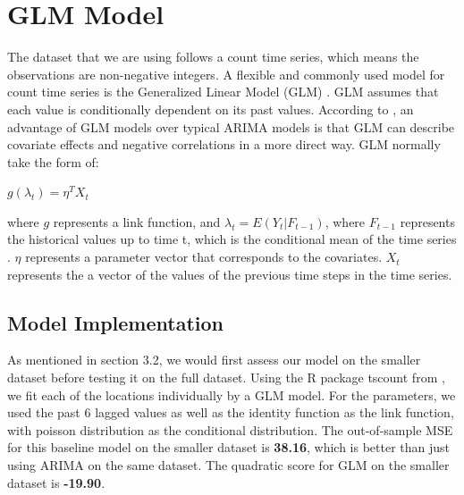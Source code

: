 \documentclass[nonblindrev,msom]{informs3} %
\begin{document}
\newpage
\section{GLM Model}
The dataset that we are using follows a count time series, which means the observations are non-negative integers. A flexible and commonly used model for count time series is the Generalized Linear Model (GLM) \cite{Nelder1972}. GLM assumes that each value is conditionally dependent on its past values. According to \cite{Tobias2017}, an advantage of GLM models over typical ARIMA models is that GLM can describe covariate effects and negative correlations in a more direct way. GLM normally take the form of:

\begin{center}
    $\displaystyle g(\lambda_t)= \eta^T X_t$
\end{center}

\noindent where $g$ represents a link function, and $\lambda_t = E(Y_t | F_{t-1})$, where $F_{t-1}$ represents the historical values up to time t, which is the conditional mean of the time series . $\eta$ represents a parameter vector that corresponds to the covariates. $X_t$ represents the a vector of the values of the previous time steps in the time series.




\subsection{Model Implementation}
\noindent As mentioned in section 3.2, we would first assess our model on the smaller dataset before testing it on the full dataset. Using the R package tscount from \cite{Tobias2017}, we fit each of the locations individually by a GLM model. For the parameters, we used the past 6 lagged values as well as the identity function as the link function, with poisson distribution as the conditional distribution. The out-of-sample MSE for this baseline model on the smaller dataset is \textbf{38.16}, which is better than just using ARIMA on the same dataset. The quadratic score for GLM on the smaller dataset is \textbf{-19.90}. \\
\end{document}
